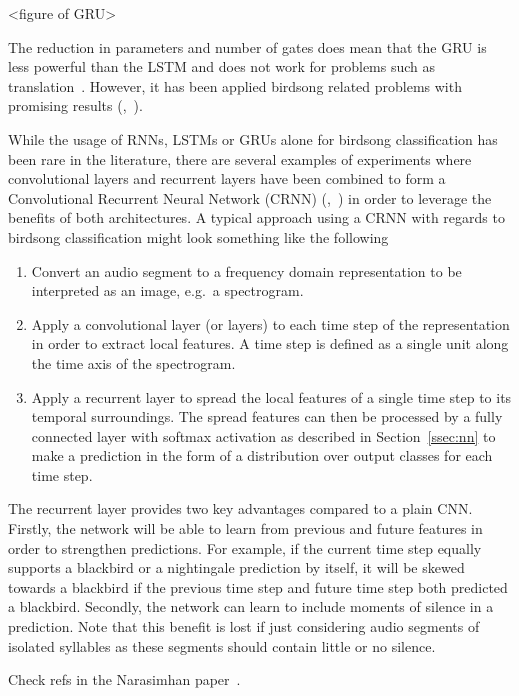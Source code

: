 <figure of GRU>

The reduction in parameters and number of gates does mean that the GRU is less
powerful than the LSTM and does not work for problems such as
translation~\cite{britz2017massive}. However, it has been applied birdsong
related problems with promising results
(\cite{parrilla2022polyphonic},~\cite{adavanne2017stacked}).

While the usage of RNNs, LSTMs or GRUs alone for birdsong classification has
been rare in the literature, there are several examples of experiments where
convolutional layers and recurrent layers have been combined to form a
Convolutional Recurrent Neural Network (CRNN)
(\cite{yan2021birdsong},~\cite{mukherjee2018convolutional}) in order to leverage
the benefits of both architectures. A typical approach using a CRNN with regards
to birdsong classification might look something like the
following~\cite{crous2019polyphonic}

\begin{enumerate}

  \item Convert an audio segment to a frequency domain representation to be
    interpreted as an image, e.g.\ a spectrogram.

  \item Apply a convolutional layer (or layers) to each time step of the
    representation in order to extract local features. A time step is defined as
    a single unit along the time axis of the spectrogram.

  \item Apply a recurrent layer to spread the local features of a single time
    step to its temporal surroundings. The spread features can then be processed
    by a fully connected layer with softmax activation as described in
    Section~\ref{ssec:nn} to make a prediction in the form of a distribution
    over output classes for each time step.

\end{enumerate}

The recurrent layer provides two key advantages compared to a plain CNN\@.
Firstly, the network will be able to learn from previous and future features in
order to strengthen predictions. For example, if the current time step equally
supports a blackbird or a nightingale prediction by itself, it will be skewed
towards a blackbird if the previous time step and future time step both
predicted a blackbird. Secondly, the network can learn to include moments of
silence in a prediction. Note that this benefit is lost if just considering
audio segments of isolated syllables as these segments should contain little or
no silence.

Check refs in the Narasimhan paper~\cite{narasimhan2017simultaneous}.
